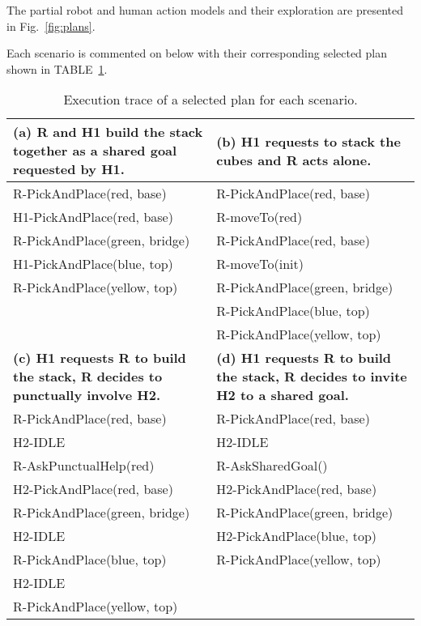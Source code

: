The partial robot and human action models and their exploration are presented in Fig.~\ref{fig:plans}.

Each scenario is commented on below with their corresponding selected plan shown in TABLE~\ref{tab:plans}.

\begin{table}
\small
\begin{tabularx}{0.98\textwidth}{|X||X|}
    \hline
    \textbf{(a) R and H1 build the stack together as a shared goal requested by H1.}     & \textbf{(b) H1 requests to stack the cubes and R acts alone.} \\
    \hline
    R-PickAndPlace(red, base)     & R-PickAndPlace(red, base) \\ 
    H1-PickAndPlace(red, base)     & R-moveTo(red) \\  
    R-PickAndPlace(green, bridge) & R-PickAndPlace(red, base) \\
    H1-PickAndPlace(blue, top)     & R-moveTo(init) \\
    R-PickAndPlace(yellow, top)   & R-PickAndPlace(green, bridge) \\
                                    & R-PickAndPlace(blue, top) \\
                                    & R-PickAndPlace(yellow, top) \\
    \hline \hline
    \textbf{(c) H1 requests R to build the stack, R decides to punctually involve H2.} & \textbf{(d) H1 requests R to build the stack, R decides to invite H2 to a shared goal.} \\
    \hline
    R-PickAndPlace(red, base)     & R-PickAndPlace(red, base) \\
    H2-IDLE                        & H2-IDLE \\
    R-AskPunctualHelp(red)        & R-AskSharedGoal() \\
    H2-PickAndPlace(red, base)     & H2-PickAndPlace(red, base) \\
    R-PickAndPlace(green, bridge) & R-PickAndPlace(green, bridge) \\
    H2-IDLE                        & H2-PickAndPlace(blue, top) \\
    R-PickAndPlace(blue, top)     & R-PickAndPlace(yellow, top) \\
    H2-IDLE                        & \\
    R-PickAndPlace(yellow, top)   & \\
    \hline
\end{tabularx}
\caption{Execution trace of a selected plan for each scenario.}
\label{tab:plans}
\end{table}

